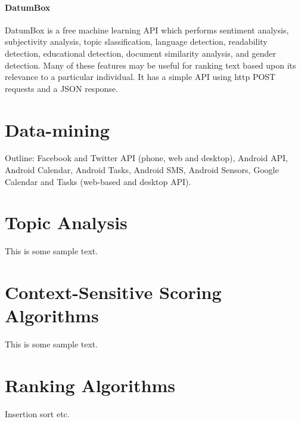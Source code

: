 \paragraph{DatumBox}
DatumBox is a free machine learning API which performs sentiment analysis, subjectivity analysis, topic slassification, language detection, readability detection, educational detection, document similarity analysis, and gender detection. Many of these features may be useful for ranking text based upon its relevance to a particular individual. It has a simple API using http POST requests and a JSON response. 

\section{Data-mining}

Outline: Facebook and Twitter API (phone, web and desktop), Android API, Android Calendar, Android Tasks, Android SMS, Android Sensors, Google Calendar and Tasks (web-based and desktop API).

\section{Topic Analysis}

This is some sample text.

\section{Context-Sensitive Scoring Algorithms}

This is some sample text.

\section{Ranking Algorithms}

Insertion sort etc.
